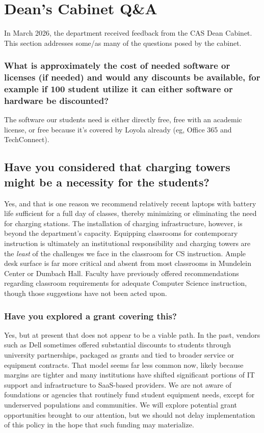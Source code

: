 

\newpage\section*{Dean's Cabinet Q\&A}

\noindent 
In March 2026, the department received feedback from the CAS Dean Cabinet. This section addresses some/as many of the questions posed by the cabinet.

\subsubsection*{What is approximately the cost of needed software or licenses (if needed) and would any discounts be available, for example if 100 student utilize it can either software or hardware be discounted?}

The software our students need is either directly free, free with an academic license, or free because it's covered by Loyola already (eg, Office 365 and TechConnect). 

\subsection*{Have you considered that charging towers might be a necessity for the students?} 

Yes, and that is one reason we recommend relatively recent laptops with battery life sufficient for a full day of classes, thereby minimizing or eliminating the need for charging stations. The installation of charging infrastructure, however, is beyond the department’s capacity. Equipping classrooms for contemporary instruction is ultimately an institutional responsibility and charging towers are the \emph{least} of the challenges we face in the classroom for CS instruction. Ample desk surface is far more critical and absent from most classrooms in Mundelein Center or Dumbach Hall. Faculty have previously offered recommendations regarding classroom requirements for adequate Computer Science instruction, though those suggestions have not been acted upon.

\subsubsection*{Have you explored a grant covering this?} 

Yes, but at present that does not appear to be a viable path. In the past, vendors such as Dell sometimes offered substantial discounts to students through university partnerships, packaged as grants and tied to broader service or equipment contracts. That model seems far less common now, likely because margins are tighter and many institutions have shifted significant portions of IT support and infrastructure to SaaS-based providers. We are not aware of foundations or agencies that routinely fund student equipment needs, except for underserved populations and communities. We will explore potential grant opportunities brought to our attention, but we should not delay implementation of this policy in the hope that such funding may materialize.

